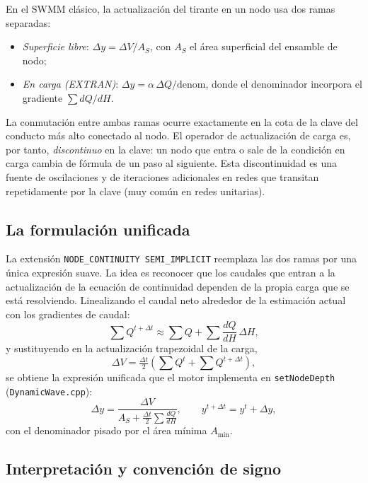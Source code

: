 \documentclass[11pt,a4paper]{article}
\begin{document}
En el SWMM clásico, la actualización del tirante en un nodo usa dos ramas
separadas:
\begin{itemize}[nosep]
  \item \emph{Superficie libre}: $\Delta y = \Delta V / A_S$, con $A_S$ el área
        superficial del ensamble de nodo;
  \item \emph{En carga (EXTRAN)}: $\Delta y = \alpha\,\Delta Q / \mathrm{denom}$,
        donde el denominador incorpora el gradiente $\sum dQ/dH$.
\end{itemize}

La conmutación entre ambas ramas ocurre exactamente en la cota de la clave del
conducto más alto conectado al nodo. El operador de actualización de carga es,
por tanto, \emph{discontinuo} en la clave: un nodo que entra o sale de la
condición en carga cambia de fórmula de un paso al siguiente. Esta
discontinuidad es una fuente de oscilaciones y de iteraciones adicionales en
redes que transitan repetidamente por la clave (muy común en redes unitarias).

\subsection{La formulación unificada}

La extensión \texttt{NODE\_CONTINUITY SEMI\_IMPLICIT} reemplaza las dos ramas
por una única expresión suave. La idea es reconocer que los caudales que
entran a la actualización de la ecuación de continuidad dependen de la propia
carga que se está resolviendo. Linealizando el caudal neto alrededor de la
estimación actual con los gradientes de caudal:
\begin{equation}
  \sum Q^{t+\Delta t} \approx \sum Q + \sum\frac{dQ}{dH}\,\Delta H,
\end{equation}
y sustituyendo en la actualización trapezoidal de la carga,
\begin{equation}
  \Delta V = \tfrac{\Delta t}{2}\left(\sum Q^{t} + \sum Q^{t+\Delta t}\right),
\end{equation}
se obtiene la expresión unificada que el motor implementa en
\texttt{setNodeDepth} (\texttt{DynamicWave.cpp}):
\begin{equation}
  \Delta y = \frac{\Delta V}{A_S + \tfrac{\Delta t}{2}\sum \frac{dQ}{dH}},
  \qquad
  y^{t+\Delta t} = y^{t} + \Delta y,
\end{equation}
con el denominador pisado por el área mínima $A_{\min}$.

\subsection{Interpretación y convención de signo}
\end{document}

